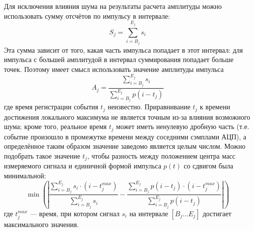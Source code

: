 Для исключения влияния шума на результаты расчета амплитуды можно использовать сумму отсчётов по импульсу в интервале:
\begin{equation*}
  S_j = \sum \limits_{i = B_j}^{E_j} s_i
\end{equation*}
Эта сумма зависит от того, какая часть импульса попадает в этот интервал: для импульса с большей амплитудой в интервал суммирования попадает больше точек. Поэтому имеет смысл использовать значение амплитуды импульса
\begin{equation*}
  A_j = \frac{ \sum\limits_{i=B_j}^{E_j} s_i }{ \sum\limits_{i=B_j}^{E_j} p( i - t_j ) }
\end{equation*}
где время регистрации события $t_j$ неизвестно. Приравнивание $t_j$ к времени достижения локального максимума не является точным из-за влияния возможного шума; кроме того, реальное время $t_j$ может иметь ненулевую дробную часть (т.е. событие произошло в промежутке времени между соседними сэмплами АЦП), а определённое таким образом значение заведомо является целым числом. Можно подобрать такое значение $t_j$, чтобы разность между положением центра масс измеряемого сигнала и единичной формой импульса $p(t)$ со сдвигом была минимальной:
\begin{equation*}
  \min \left( \left| \frac{ \sum \limits_{i = B_j}^{E_j} s_i \cdot (i - t_j^{max}) }{\sum \limits_{i = B_j}^{E_j} s_i} - 
                     \frac{ \sum \limits_{i = B_j}^{E_j} p( i - t_j ) \cdot (i - t_j^{max}) }{\sum \limits_{i = B_j}^{E_j} p(i - t_j) }   \right| \right) 
\end{equation*}
где $t_j^{max}$ --- время, при котором сигнал $s_i$ на интервале $\left[ B_j \ldots E_j \right] $ достигает максимального значения.~\cite{Khilkevitch2020} 

